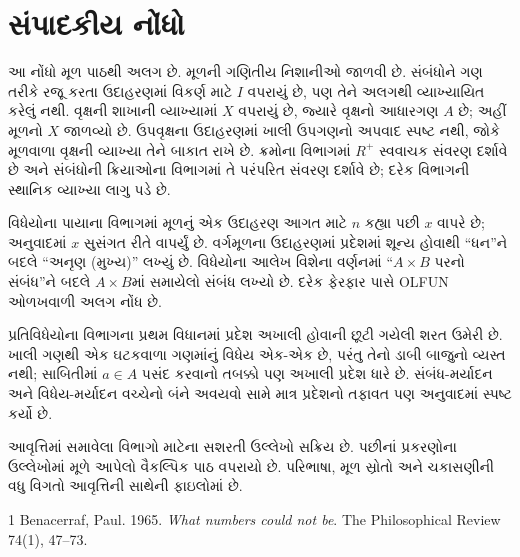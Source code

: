 \section*{સંપાદકીય નોંધો}
આ નોંધો મૂળ પાઠથી અલગ છે. મૂળની ગણિતીય નિશાનીઓ જાળવી છે.
સંબંધોને ગણ તરીકે રજૂ કરતા ઉદાહરણમાં વિકર્ણ માટે \(I\) વપરાયું છે,
પણ તેને અલગથી વ્યાખ્યાયિત કરેલું નથી. વૃક્ષની શાખાની વ્યાખ્યામાં
\(X\) વપરાયું છે, જ્યારે વૃક્ષનો આધારગણ \(A\) છે; અહીં મૂળનો
\(X\) જાળવ્યો છે. ઉપવૃક્ષના ઉદાહરણમાં ખાલી ઉપગણનો અપવાદ
સ્પષ્ટ નથી, જોકે મૂળવાળા વૃક્ષની વ્યાખ્યા તેને બાકાત રાખે છે.
ક્રમોના વિભાગમાં \(R^+\) સ્વવાચક સંવરણ દર્શાવે છે અને
સંબંધોની ક્રિયાઓના વિભાગમાં તે પરંપરિત સંવરણ દર્શાવે છે;
દરેક વિભાગની સ્થાનિક વ્યાખ્યા લાગુ પડે છે.

વિધેયોના પાયાના વિભાગમાં મૂળનું એક ઉદાહરણ આગત માટે \(n\)
કહ્યા પછી \(x\) વાપરે છે; અનુવાદમાં \(x\) સુસંગત રીતે વાપર્યું છે.
વર્ગમૂળના ઉદાહરણમાં પ્રદેશમાં શૂન્ય હોવાથી “ધન”ને બદલે
“અનૃણ (મુખ્ય)” લખ્યું છે. વિધેયોના આલેખ વિશેના વર્ણનમાં
“\(A\times B\) પરનો સંબંધ”ને બદલે \(A\times B\)માં સમાયેલો
સંબંધ લખ્યો છે. દરેક ફેરફાર પાસે OLFUN ઓળખવાળી અલગ નોંધ છે.

પ્રતિવિધેયોના વિભાગના પ્રથમ વિધાનમાં પ્રદેશ અખાલી હોવાની
છૂટી ગયેલી શરત ઉમેરી છે. ખાલી ગણથી એક ઘટકવાળા ગણમાંનું
વિધેય એક-એક છે, પરંતુ તેનો ડાબી બાજુનો વ્યસ્ત નથી; સાબિતીમાં
\(a\in A\) પસંદ કરવાનો તબક્કો પણ અખાલી પ્રદેશ ધારે છે.
સંબંધ-મર્યાદન અને વિધેય-મર્યાદન વચ્ચેનો બંને અવયવો સામે
માત્ર પ્રદેશનો તફાવત પણ અનુવાદમાં સ્પષ્ટ કર્યો છે.

આવૃત્તિમાં સમાવેલા વિભાગો માટેના સશરતી ઉલ્લેખો સક્રિય છે.
પછીનાં પ્રકરણોના ઉલ્લેખોમાં મૂળે આપેલો વૈકલ્પિક પાઠ વપરાયો છે.
પરિભાષા, મૂળ સ્રોતો અને ચકાસણીની વધુ વિગતો આવૃત્તિની
સાથેની ફાઇલોમાં છે.
\begin{thebibliography}{1}
Benacerraf, Paul. 1965.
\emph{What numbers could not be}.
The Philosophical Review 74(1), 47--73.
\end{thebibliography}


